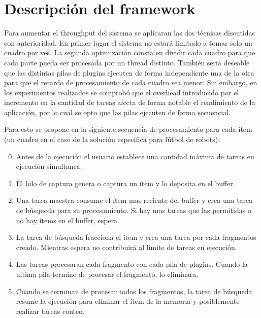 
\section{Descripción del framework}

Para aumentar el throughput del sistema se aplicaran las dos técnicas discutidas
con anterioridad. En primer lugar el sistema no estará limitado a tomar solo un
cuadro por ves. La segunda optimización consta en dividir cada cuadro para que
cada parte pueda ser procesada por un thread distinto. También seria deseable
que las distintas pilas de plugins ejecuten de forma independiente una de la
otra para que el retardo de procesamiento de cada cuadro sea menor.  Sin
embargo, en los experimentos realizados se comprobó que el overhead introducido
por el incremento en la cantidad de tareas afecta de forma notable el
rendimiento de la aplicación, por lo cual se opto que las pilas ejecuten de
forma secuencial.

Para esto se propone en la siguiente secuencia de procesamiento para cada ítem
(un cuadro en el caso de la solución especifica para fútbol de robots):

\begin{enumerate}

\setcounter{enumi}{-1}

\item	Antes de la ejecución el usuario establece una cantidad máxima de tareas
	en ejecución simultanea.

\item	El hilo de captura genera o captura un ítem y lo deposita en el buffer.

\item	Una tarea maestra consume el ítem mas reciente del buffer y crea una
	tarea de búsqueda para su procesamiento. Si hay mas tareas que las
	permitidas o no hay ítems en el buffer, espera.

\item	La tarea de búsqueda fracciona el ítem y crea una tarea por cada
	fragmentos creado. Mientras espera no contribuirá al limite de tareas en
	ejecución.

\item	Las tareas procesaran cada fragmento con cada pila de plugins.  Cuando
	la ultima pila termine de procesar el fragmento, lo eliminara.

\item	Cuando se terminan de procesar todos los fragmentos, la tarea de
	búsqueda resume la ejecución para eliminar el ítem de la memoria y
	posiblemente realizar tareas conteo.

\end{enumerate}

